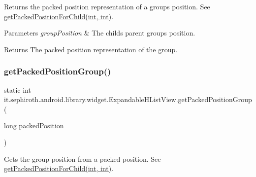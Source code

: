 Returns the packed position representation of a group\textquotesingle{}s position. See \hyperlink{classit_1_1sephiroth_1_1android_1_1library_1_1widget_1_1_expandable_h_list_view_a37af0955cf4697ca1af59fbceff91fda}{get\+Packed\+Position\+For\+Child(int, int)}.


\begin{DoxyParams}{Parameters}
{\em group\+Position} & The child\textquotesingle{}s parent group\textquotesingle{}s position. \\
\hline
\end{DoxyParams}
\begin{DoxyReturn}{Returns}
The packed position representation of the group. 
\end{DoxyReturn}
\mbox{\label{classit_1_1sephiroth_1_1android_1_1library_1_1widget_1_1_expandable_h_list_view_ada2257e0f53c0c4dfe19c7e0fa155aad}} 
\subsubsection{\texorpdfstring{get\+Packed\+Position\+Group()}{getPackedPositionGroup()}}
{\footnotesize\ttfamily static int it.\+sephiroth.\+android.\+library.\+widget.\+Expandable\+H\+List\+View.\+get\+Packed\+Position\+Group (\begin{DoxyParamCaption}\item[{long}]{packed\+Position }\end{DoxyParamCaption})\hspace{0.3cm}{\ttfamily [static]}}

Gets the group position from a packed position. See \hyperlink{classit_1_1sephiroth_1_1android_1_1library_1_1widget_1_1_expandable_h_list_view_a37af0955cf4697ca1af59fbceff91fda}{get\+Packed\+Position\+For\+Child(int, int)}.


